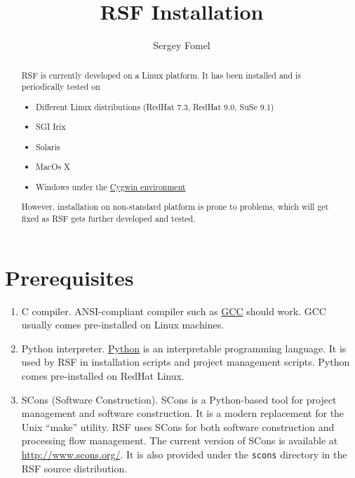 \title{RSF Installation}
\author{Sergey Fomel}

%

\maketitle

\begin{abstract}
RSF is currently developed on a Linux platform. It has been installed and is
periodically tested on
\begin{itemize}
\item Different Linux distributions (RedHat 7.3, RedHat 9.0, SuSe 9.1)
\item SGI Irix
\item Solaris
\item MacOs X
\item Windows under the \href{http://www.cygwin.com/}{Cygwin environment} 
\end{itemize}
However, installation on non-standard platform is prone to problems, which
will get fixed as RSF gets further developed and tested.
\end{abstract}

\section{Prerequisites}

\begin{enumerate}
\item C compiler. ANSI-compliant compiler such as
  \href{http://gcc.gnu.org/}{GCC} should work. GCC usually comes pre-installed
  on Linux machines.
\item Python interpreter. \href{http://www.python.org/}{Python} is an
  interpretable programming language. It is used by RSF in installation
  scripts and project management scripts.  Python comes pre-installed on
  RedHat Linux.
\item SCons (Software Construction). SCons is a Python-based tool for project
  management and software construction. It is a modern replacement for the
  Unix ``make'' utility. RSF uses SCons for both software construction and
  processing flow management. The current version of SCons is available at
  \url{http://www.scons.org/}. It is also provided under the \texttt{scons}
  directory in the RSF source distribution.
\end{enumerate}

